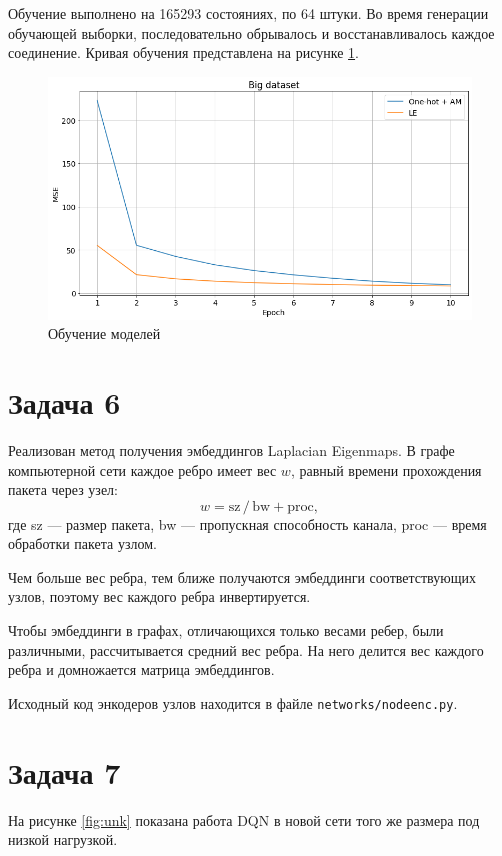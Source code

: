 \documentclass[a4paper]{article}
\begin{document}
Обучение выполнено на 165293 состояниях, по 64 штуки. Во время генерации
обучающей выборки, последовательно обрывалось и восстанавливалось каждое
соединение. Кривая обучения представлена на рисунке \ref{fig:mse}.

\begin{figure}[H]
    \centering
    \includegraphics[width=\textwidth]{figs/mse}
    \caption{Обучение моделей}\label{fig:mse}
\end{figure}

\section{Задача 6}

Реализован метод получения эмбеддингов Laplacian Eigenmaps. В графе
компьютерной сети каждое ребро имеет вес $w$, равный времени прохождения пакета
через узел:
\[
    w = \text{sz}\, /\, \text{bw} + \text{proc},
\]
где sz --- размер пакета, bw --- пропускная способность канала, proc --- время
обработки пакета узлом.

Чем больше вес ребра, тем ближе получаются эмбеддинги соответствующих узлов,
поэтому вес каждого ребра инвертируется.

Чтобы эмбеддинги в графах, отличающихся только весами ребер, были различными,
рассчитывается средний вес ребра. На него делится вес каждого ребра и
домножается матрица эмбеддингов.

Исходный код энкодеров узлов находится в файле \texttt{networks/nodeenc.py}.

\section{Задача 7}

На рисунке \ref{fig:unk} показана работа DQN в новой сети того же размера под
низкой нагрузкой.
\end{document}
